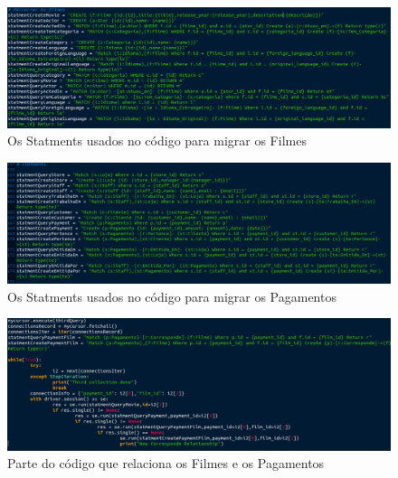 \begin{figure}[H]

  \centering

  \includegraphics[width=\textwidth]{FilmesStatment.png}

  \caption {Os Statments usados no código para migrar os Filmes}

  \label {fig:FilmStatment}

\end{figure}

\begin{figure}[H]

  \centering

  \includegraphics[width=\textwidth]{PagamentosStatment.png}

  \caption {Os Statments usados no código para migrar os Pagamentos}

  \label {fig:PagamentoStatment}

\end{figure}

\begin{figure}[H]

  \centering

  \includegraphics[width=\textwidth]{ConexaoStatment.png}

  \caption {Parte do código que relaciona os Filmes e os Pagamentos}

  \label {fig:ConexaoStatment}

\end{figure}




